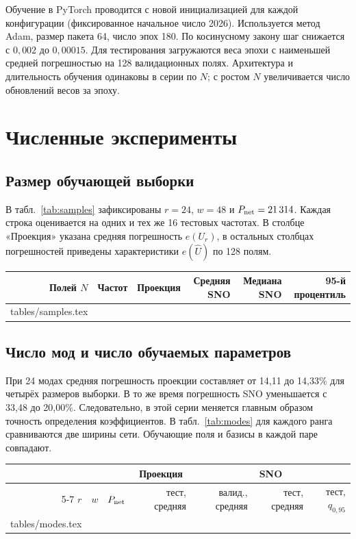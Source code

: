 \documentclass[11pt,a4paper]{article}
\makeatletter
\newenvironment{localtable}{\par\medskip\begingroup\centering\small\renewcommand{\arraystretch}{1.18}}{\par\endgroup\medskip}
\newcommand{\tabinput}[1]{\@@input #1.tex }
\makeatother
\begin{document}
Обучение в PyTorch проводится с новой инициализацией для каждой конфигурации (фиксированное начальное число 2026). Используется метод Adam, размер пакета 64, число эпох 180. По косинусному закону шаг снижается с $0{,}002$ до $0{,}00015$. Для тестирования загружаются веса эпохи с наименьшей средней погрешностью на 128 валидационных полях. Архитектура и длительность обучения одинаковы в серии по $N$; с ростом $N$ увеличивается число обновлений весов за эпоху.

\section{Численные эксперименты}
\subsection*{Размер обучающей выборки}
В табл.~\ref{tab:samples} зафиксированы $r=24$, $w=48$ и $P_{\rm net}=21\,314$. Каждая строка оценивается на одних и тех же 16 тестовых частотах. В столбце «Проекция» указана средняя погрешность $e(U_r)$, в остальных столбцах погрешностей приведены характеристики $e(\widehat U)$ по 128 полям.

\begin{localtable}
\label{tab:samples}
\begin{tabular}{rrrrrr}\toprule
Полей $N$ & Частот & Проекция & Средняя SNO & Медиана SNO & 95-й процентиль\\\midrule
\tabinput{tables/samples}\bottomrule
\end{tabular}
\end{localtable}

\clearpage
\subsection*{Число мод и число обучаемых параметров}
При 24 модах средняя погрешность проекции составляет от 14,11 до 14,33\% для четырёх размеров выборки. В то же время погрешность SNO уменьшается с 33,48 до 20,00\%. Следовательно, в этой серии меняется главным образом точность определения коэффициентов. В табл.~\ref{tab:modes} для каждого ранга сравниваются две ширины сети. Обучающие поля и базисы в каждой паре совпадают.

\begin{localtable}
\label{tab:modes}
\begin{tabular}{rrr rrrr}\toprule
 & & & \multicolumn{1}{c}{Проекция} & \multicolumn{3}{c}{SNO}\\
\cmidrule(lr){5-7}
$r$ & $w$ & $P_{\rm net}$ & тест, средняя & валид., средняя & тест, средняя & тест, $q_{0{,}95}$\\\midrule
\tabinput{tables/modes}\bottomrule
\end{tabular}
\end{localtable}
\end{document}
